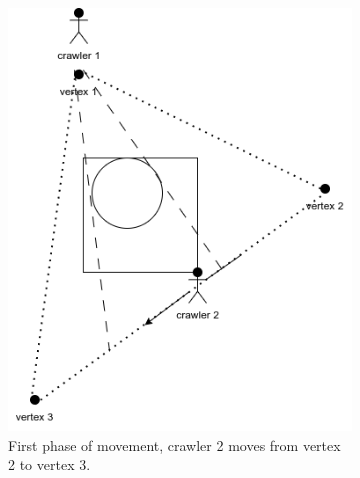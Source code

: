 \begin{figure}[h!]
\begin{subfigure}[t]{0.27\linewidth}
		\includegraphics[width=\linewidth]{graphics/triangle_2.png}
		\caption{First phase of movement, crawler 2 moves from vertex 2 to vertex 3.}
		\label{fig:triangle_2}
	\end{subfigure}
	\hfill
	\begin{subfigure}[t]{0.27\linewidth}
		\centering

\end{subfigure}
\end{figure}
